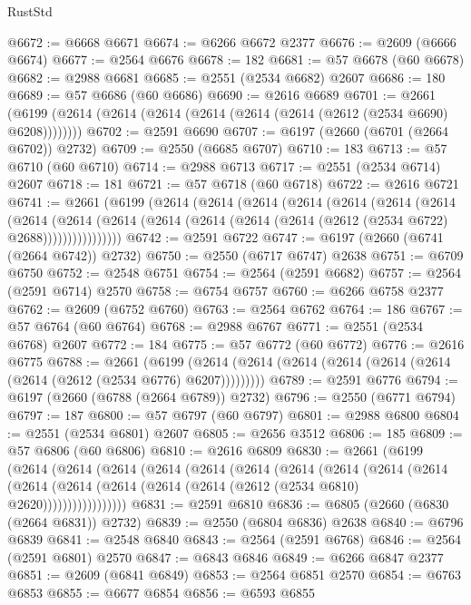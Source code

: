 \begin{lexlean}{RustStd}
\begin{coremodule}
@6672 := @6668 @6671
@6674 := @6266 @6672 @2377
@6676 := @2609 (@6666 @6674)
@6677 := @2564 @6676
@6678 := 182
@6681 := @57 @6678 (@60 @6678)
@6682 := @2988 @6681
@6685 := @2551 (@2534 @6682) @2607
@6686 := 180
@6689 := @57 @6686 (@60 @6686)
@6690 := @2616 @6689
@6701 := @2661 (@6199 (@2614 (@2614 (@2614 (@2614 (@2614 (@2614 (@2612 (@2534 @6690) @6208))))))))
@6702 := @2591 @6690
@6707 := @6197 (@2660 (@6701 (@2664 @6702)) @2732)
@6709 := @2550 (@6685 @6707)
@6710 := 183
@6713 := @57 @6710 (@60 @6710)
@6714 := @2988 @6713
@6717 := @2551 (@2534 @6714) @2607
@6718 := 181
@6721 := @57 @6718 (@60 @6718)
@6722 := @2616 @6721
@6741 := @2661
    (@6199
      (@2614
        (@2614
          (@2614
            (@2614
              (@2614
                (@2614
                  (@2614
                    (@2614
                      (@2614
                        (@2614
                          (@2614 (@2614 (@2614 (@2614 (@2612 (@2534 @6722) @2688))))))))))))))))
@6742 := @2591 @6722
@6747 := @6197 (@2660 (@6741 (@2664 @6742)) @2732)
@6750 := @2550 (@6717 @6747) @2638
@6751 := @6709 @6750
@6752 := @2548 @6751
@6754 := @2564 (@2591 @6682)
@6757 := @2564 (@2591 @6714) @2570
@6758 := @6754 @6757
@6760 := @6266 @6758 @2377
@6762 := @2609 (@6752 @6760)
@6763 := @2564 @6762
@6764 := 186
@6767 := @57 @6764 (@60 @6764)
@6768 := @2988 @6767
@6771 := @2551 (@2534 @6768) @2607
@6772 := 184
@6775 := @57 @6772 (@60 @6772)
@6776 := @2616 @6775
@6788 := @2661
    (@6199 (@2614 (@2614 (@2614 (@2614 (@2614 (@2614 (@2614 (@2612 (@2534 @6776) @6207)))))))))
@6789 := @2591 @6776
@6794 := @6197 (@2660 (@6788 (@2664 @6789)) @2732)
@6796 := @2550 (@6771 @6794)
@6797 := 187
@6800 := @57 @6797 (@60 @6797)
@6801 := @2988 @6800
@6804 := @2551 (@2534 @6801) @2607
@6805 := @2656 @3512
@6806 := 185
@6809 := @57 @6806 (@60 @6806)
@6810 := @2616 @6809
@6830 := @2661
    (@6199
      (@2614
        (@2614
          (@2614
            (@2614
              (@2614
                (@2614
                  (@2614
                    (@2614
                      (@2614
                        (@2614
                          (@2614
                            (@2614 (@2614 (@2614 (@2614 (@2612 (@2534 @6810) @2620)))))))))))))))))
@6831 := @2591 @6810
@6836 := @6805 (@2660 (@6830 (@2664 @6831)) @2732)
@6839 := @2550 (@6804 @6836) @2638
@6840 := @6796 @6839
@6841 := @2548 @6840
@6843 := @2564 (@2591 @6768)
@6846 := @2564 (@2591 @6801) @2570
@6847 := @6843 @6846
@6849 := @6266 @6847 @2377
@6851 := @2609 (@6841 @6849)
@6853 := @2564 @6851 @2570
@6854 := @6763 @6853
@6855 := @6677 @6854
@6856 := @6593 @6855

\end{coremodule}
\end{lexlean}

